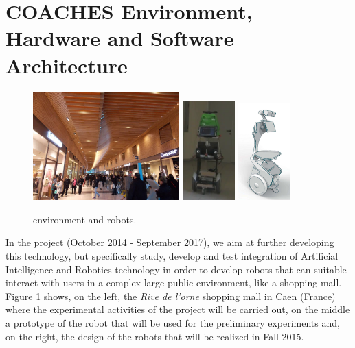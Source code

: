 \section{COACHES Environment, Hardware and Software Architecture}
\vspace{-0.1cm}
\begin{figure}[t!]
\centering
\includegraphics[height=4.2cm]{fig/rivedelorne}\hspace{0.1cm}\hfill
\includegraphics[width=0.18\textwidth]{fig/diago1}\hspace{0.1cm}\hfill
\includegraphics[width=0.18\textwidth]{fig/coaches_robot}
\caption{\coaches environment and robots.}
\label{fig:env}
\end{figure}

In the {\coaches} project (October 2014 - September 2017), we aim at further developing this technology, but specifically study, develop and test integration of Artificial Intelligence and Robotics technology in order to develop robots that can suitable interact with users in a complex large public environment, like a shopping mall.
Figure \ref{fig:env} shows, on the left, the \emph{Rive de l'orne} shopping mall in Caen (France) where the experimental activities of the project will be carried out, on the middle a prototype of the robot that will be used for the preliminary experiments and, on the right, the design of the robots that will be realized in Fall 2015.


